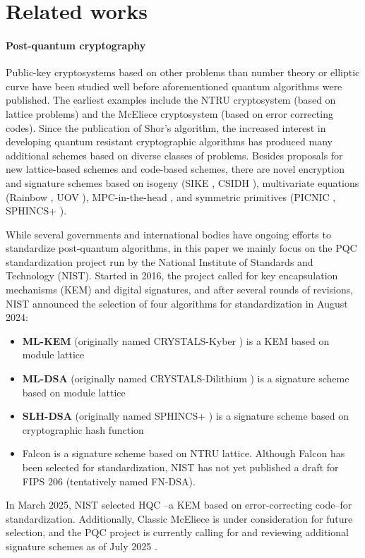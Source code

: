 \documentclass[letterpaper,12pt,titlepage,oneside,final]{book}
\begin{document}
\section{Related works}\label{sec:intro-related-works}
\paragraph{Post-quantum cryptography} Public-key cryptosystems based on other problems than number theory or elliptic curve have been studied well before aforementioned quantum algorithms were published.
The earliest examples include the NTRU cryptosystem \cite{DBLP:conf/ants/HoffsteinPS98} (based on lattice problems) and the McEliece cryptosystem \cite{mceliece1978public} (based on error correcting codes).
Since the publication of Shor's algorithm, the increased interest in developing quantum resistant cryptographic algorithms has produced many additional schemes based on diverse classes of problems.
Besides proposals for new lattice-based schemes and code-based schemes, there are novel encryption and signature schemes based on isogeny (SIKE \cite{DBLP:conf/pqcrypto/JaoF11}, CSIDH \cite{DBLP:journals/iacr/CastryckLMPR18}), multivariate equations (Rainbow \cite{ding2019rainbow}, UOV \cite{DBLP:conf/eurocrypt/KipnisPG99}), MPC-in-the-head \cite{DBLP:conf/stoc/IshaiKOS07}, and symmetric primitives (PICNIC \cite{DBLP:conf/ccs/ChaseDGORRSZ17}, SPHINCS+ \cite{DBLP:journals/iacr/BernsteinHKNRS19}).

While several governments and international bodies have ongoing efforts to standardize post-quantum algorithms, in this paper we mainly focus on the PQC standardization project run by the National Institute of Standards and Technology (NIST).
Started in 2016, the project called for key encapsulation mechanisms (KEM) and digital signatures, and after several rounds of revisions, NIST announced the selection of four algorithms for standardization in August 2024: \begin{itemize}
    \item {\bf ML-KEM} \cite{FIPS203} (originally named CRYSTALS-Kyber \cite{DBLP:conf/eurosp/BosDKLLSSSS18}) is a KEM based on module lattice
    \item {\bf ML-DSA} \cite{FIPS204} (originally named CRYSTALS-Dilithium
    \cite{DBLP:journals/tches/DucasKLLSSS18}) is a signature scheme based on module lattice
    \item {\bf SLH-DSA} \cite{FIPS205} (originally named SPHINCS+
    \cite{DBLP:journals/iacr/BernsteinHKNRS19}) is a signature scheme based on cryptographic hash function
    \item Falcon \cite{falcon2020spec} is a signature scheme based on NTRU lattice. Although Falcon has been selected for standardization, NIST has not yet published a draft for FIPS 206 (tentatively named FN-DSA).
\end{itemize}
In March 2025, NIST selected HQC \cite{melchor2022hqc}--a KEM based on error-correcting code--for standardization.
Additionally, Classic McEliece \cite{bernstein2022classicmceliece} is under consideration for future selection, and the PQC project is currently calling for and reviewing additional signature schemes as of July 2025 \cite{nist2022call-addtl-signatures}.
\end{document}
